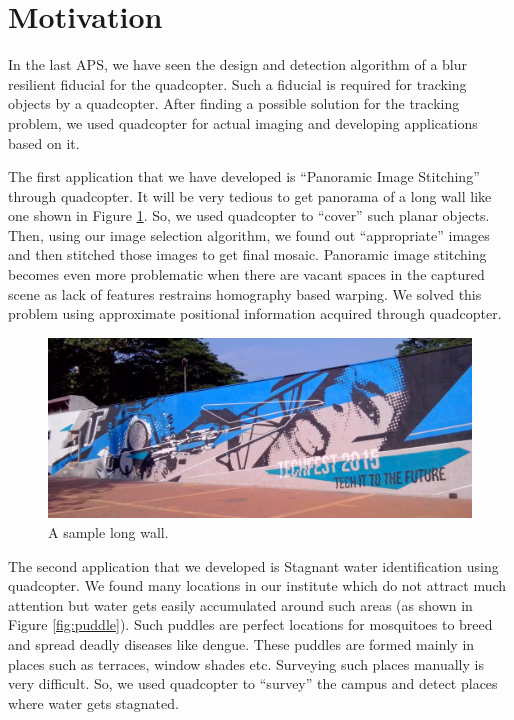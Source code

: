 \documentclass[11pt]{article}
\begin{document}
\section{Motivation}
In the last APS, we have seen the design and detection algorithm of a blur
resilient fiducial for the quadcopter. Such a fiducial is required for tracking objects by
a quadcopter. After finding a possible solution for the tracking problem, we
used quadcopter for actual imaging and developing applications based on it.

The first application that we have developed is ``Panoramic Image Stitching''
through quadcopter. It will be very tedious to get panorama of a long wall like one
shown in Figure \ref{fig:wall}. So, we used quadcopter to ``cover'' such planar
objects. Then, using our image selection algorithm, we found out ``appropriate'' images
and then stitched those images to get final mosaic. Panoramic image stitching
becomes even more problematic when there are vacant spaces in the captured
scene as lack of features restrains homography based warping. We solved this
problem using approximate positional information acquired through quadcopter.

\begin{figure}[ht!]
 \centering
  \includegraphics[width=\linewidth]{IMG_20150415_155624.jpg}
  \caption{A sample long wall.}
  \label{fig:wall}
\end{figure}

The second application that we developed is Stagnant water identification
using quadcopter. We found many locations in our institute  which do not attract
much attention but water gets easily accumulated around such areas (as shown in
Figure \ref{fig:puddle}). Such puddles are perfect locations for mosquitoes to
breed and spread deadly diseases like dengue. These puddles are formed mainly in
places such as terraces, window shades etc. Surveying such places manually is
very difficult. So, we used quadcopter to ``survey'' the campus and detect
places where water gets stagnated.
\end{document}
